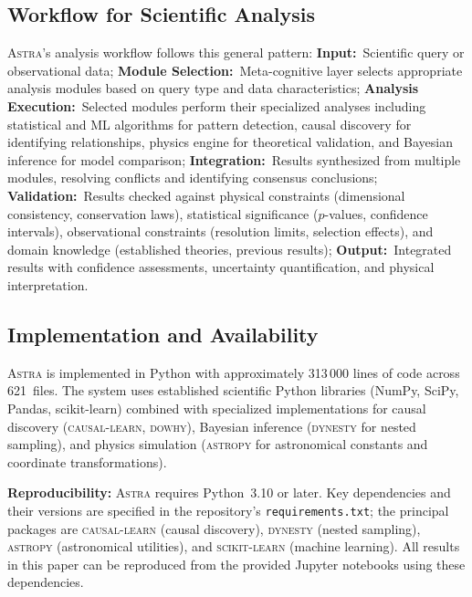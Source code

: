 \documentclass[usenatbib]{rasti}
\newcommand{\astra}{\textsc{Astra}\xspace}
\begin{document}
\subsection{Workflow for Scientific Analysis}
\label{sec:methods:workflow}

\astra's analysis workflow follows this general pattern:
\textbf{Input:}~Scientific query or observational data;
\textbf{Module Selection:}~Meta-cognitive layer selects appropriate analysis modules based on query type and data characteristics;
\textbf{Analysis Execution:}~Selected modules perform their specialized analyses including statistical and ML algorithms for pattern detection, causal discovery for identifying relationships, physics engine for theoretical validation, and Bayesian inference for model comparison;
\textbf{Integration:}~Results synthesized from multiple modules, resolving conflicts and identifying consensus conclusions;
\textbf{Validation:}~Results checked against physical constraints (dimensional consistency, conservation laws), statistical significance ($p$-values, confidence intervals), observational constraints (resolution limits, selection effects), and domain knowledge (established theories, previous results);
\textbf{Output:}~Integrated results with confidence assessments, uncertainty quantification, and physical interpretation.

\subsection{Implementation and Availability}
\label{sec:methods:implementation}

\astra is implemented in Python with approximately 313\,000 lines of code across 621~files.
The system uses established scientific Python libraries (NumPy, SciPy, Pandas, scikit-learn) combined with specialized implementations for causal discovery (\textsc{causal-learn}, \textsc{dowhy}), Bayesian inference (\textsc{dynesty} for nested sampling), and physics simulation (\textsc{astropy} for astronomical constants and coordinate transformations).

\textbf{Reproducibility:}
\astra requires Python~3.10 or later.
Key dependencies and their versions are specified in the repository's \texttt{requirements.txt}; the principal packages are \textsc{causal-learn} (causal discovery), \textsc{dynesty} (nested sampling), \textsc{astropy} (astronomical utilities), and \textsc{scikit-learn} (machine learning).
All results in this paper can be reproduced from the provided Jupyter notebooks using these dependencies.
\end{document}
